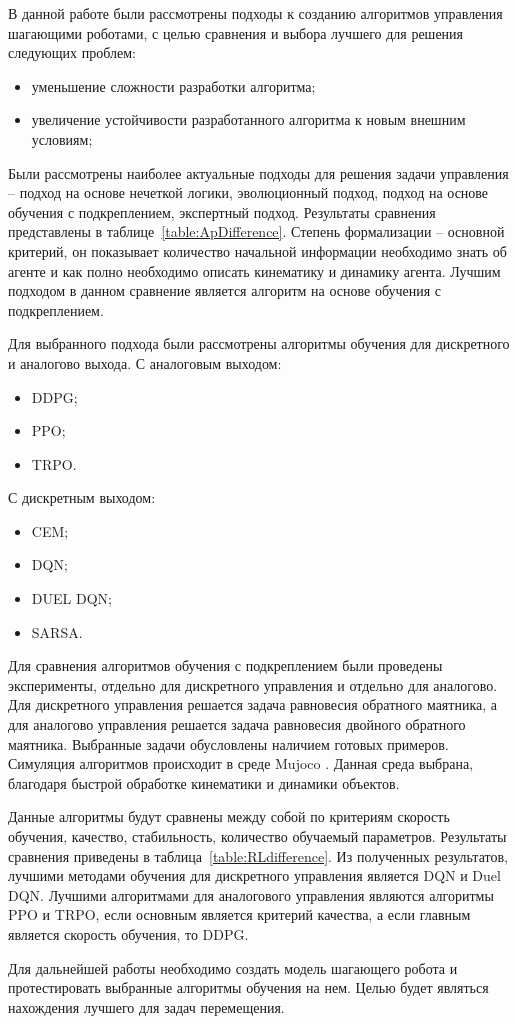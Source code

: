 В данной работе были рассмотрены подходы к созданию алгоритмов управления шагающими роботами, с целью сравнения и выбора лучшего для решения следующих проблем:
\begin{itemize}
	\item уменьшение сложности разработки алгоритма;
	\item увеличение устойчивости разработанного алгоритма к новым внешним условиям;
\end{itemize}

Были рассмотрены наиболее актуальные подходы для решения задачи управления -- подход на основе нечеткой логики, эволюционный подход, подход на основе обучения с подкреплением, экспертный подход. 
Результаты сравнения представлены в \mbox{таблице \ref{table:ApDifference}.}
Степень формализации -- основной критерий, он показывает количество начальной информации необходимо знать об агенте и как полно необходимо описать кинематику и динамику агента.
Лучшим подходом в данном сравнение является алгоритм на основе обучения с подкреплением.

Для выбранного подхода были рассмотрены алгоритмы обучения для дискретного и аналогово выхода.
С аналоговым выходом:
\begin{itemize}
	\item DDPG;
	\item PPO;
	\item TRPO.
\end{itemize}

С дискретным выходом:
\begin{itemize}
	\item CEM;
	\item DQN;
	\item DUEL DQN;
	\item SARSA.
\end{itemize}

Для сравнения алгоритмов обучения с подкреплением были проведены эксперименты, отдельно для дискретного управления и отдельно для аналогово. 
Для дискретного управления решается задача равновесия обратного маятника, а для аналогово управления решается задача равновесия двойного обратного маятника. 
Выбранные задачи обусловлены наличием готовых примеров. 
Симуляция алгоритмов происходит в среде Mujoco \cite{mujoco}. Данная среда выбрана, благодаря быстрой обработке кинематики и динамики объектов.

Данные алгоритмы будут сравнены между собой по критериям скорость обучения, качество, стабильность, количество обучаемый параметров.
Результаты сравнения приведены в \mbox{таблица \ref{table:RLdifference}.}
Из полученных результатов, лучшими методами обучения для дискретного управления является DQN и Duel DQN.
Лучшими алгоритмами для аналогового управления являются алгоритмы PPO и TRPO, если основным является критерий качества, а если главным является скорость обучения, то DDPG.

Для дальнейшей работы необходимо создать модель шагающего робота и протестировать выбранные алгоритмы обучения на нем. 
Целью будет являться нахождения лучшего для задач перемещения.
\clearpage
